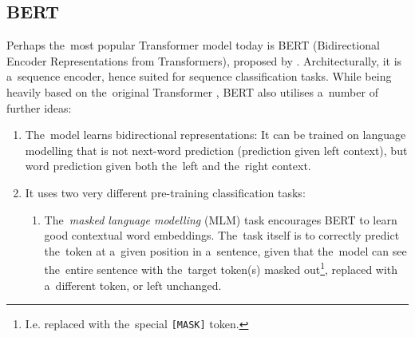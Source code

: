 \documentclass[bsc,frontabs,singlespacing,parskip,deptreport]{infthesis}
\begin{document}
{{    \subsection{BERT}{
      \label{sec:BERT}
      Perhaps the~most popular Transformer model today is BERT (Bidirectional Encoder Representations from Transformers), proposed by \citet{Devlin_2018}. Architecturally, it is a~sequence encoder, hence suited for sequence classification tasks. While being heavily based on the~original Transformer \citep{Vaswani_2017}, BERT also utilises a~number of further ideas:
      \begin{enumerate}
        \item The~model learns bidirectional representations: It can be trained on language modelling that is not next-word prediction (prediction given left context), but word prediction given both the~left and the~right context.
        \item {It uses two very different pre-training classification tasks:
        \begin{enumerate}
          \item The~\textit{masked language modelling} (MLM) task encourages BERT to learn good contextual word embeddings. The~task itself is to correctly predict the~token at a~given position in a~sentence, given that the~model can see the~entire sentence with the~target token(s) masked out\footnote{I.e. replaced with the~special \verb|[MASK]| token.}, replaced with a~different token, or left unchanged.
          

\end{enumerate}}
\end{enumerate}}}}
\end{document}
